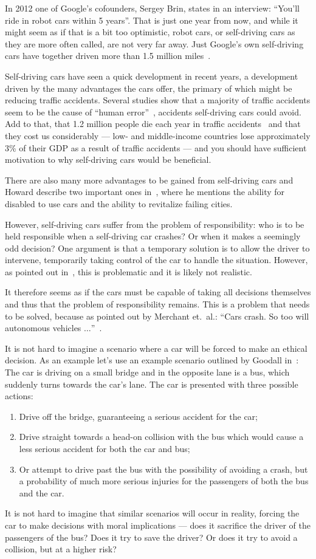 In 2012 one of Google's cofounders, Sergey Brin, states in an interview: ``You'll
ride in robot cars within 5 years''. That is just one year from now, and while
it might seem as if that is a bit too optimistic, robot cars, or self-driving
cars as they are more often called, are not very far away. Just Google's own
self-driving cars have together driven more than 1.5 million
miles~\cite{google_gscp}.

Self-driving cars have seen a quick development in recent years, a development
driven by the many advantages the cars offer, the primary of which might be
reducing traffic accidents. Several studies show that a majority of traffic
accidents seem to be the cause of ``human error''~\cite{relative_trfoudas},
accidents self-driving cars could avoid. Add to that, that 1.2 million people
die each year in traffic
accidents~\cite{worldhealthorganization_2015_global_gsrors2sadoa} and that they
cost us considerably --- low- and middle-income countries lose approximately 3\%
of their GDP as a result of traffic accidents --- and you should have sufficient
motivation to why self-driving cars would be beneficial.

There are also many more advantages to be gained from self-driving cars and
Howard describe two important ones in~\cite{howard_science_smbarotrtmiotdc},
where he mentions the ability for disabled to use cars and the ability to
revitalize failing cities.

However, self-driving cars suffer from the problem of responsibility: who is to
be held responsible when a self-driving car crashes? Or when it makes a
seemingly odd decision? One argument is that a temporary solution is to allow the
driver to intervene, temporarily taking control of the car to handle the
situation. However, as pointed out in~\cite{goodall_2014_machine_meaav}, this is
problematic and it is likely not realistic.

It therefore seems as if the cars must be capable of taking all decisions
themselves and thus that the problem of responsibility remains. This is a
problem that needs to be solved, because as pointed out by Merchant et.\ al.:
``Cars crash. So too will autonomous vehicles
$\ldots$''~\cite{marchant_2012_coming_ccbavatlst}.

It is not hard to imagine a scenario where a car will be forced to make an
ethical decision. As an example let's use an example scenario outlined by
Goodall in~\cite{goodall_2014_ethical_edmdavc}:
The car is driving on a small bridge and in the opposite lane is a bus, which
suddenly turns towards the car's lane. The car is presented with three possible
actions:
\begin{enumerate}
\item Drive off the bridge, guaranteeing a serious accident for the car;
\item Drive straight towards a head-on collision with the bus which would cause
  a less serious accident for both the car and bus;
\item Or attempt to drive past the bus with the possibility of avoiding a crash,
  but a probability of much more serious injuries for the passengers of both the
  bus and the car.
\end{enumerate}

It is not hard to imagine that similar scenarios will occur in reality, forcing
the car to make decisions with moral implications --- does it sacrifice the
driver of the passengers of the bus? Does it try to save the driver? Or does it
try to avoid a collision, but at a higher risk?